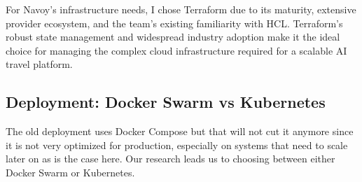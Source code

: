 For Navoy's infrastructure needs, I chose Terraform due to its maturity, extensive provider ecosystem, and the team's existing familiarity with HCL. Terraform's robust state management and widespread industry adoption make it the ideal choice for managing the complex cloud infrastructure required for a scalable AI travel platform.

\subsection{Deployment: Docker Swarm vs Kubernetes}
The old deployment uses Docker Compose but that will not cut it anymore since it is not very optimized for production, especially on systems that need to scale later on as is the case here.
Our research leads us to choosing between either Docker Swarm or Kubernetes.

